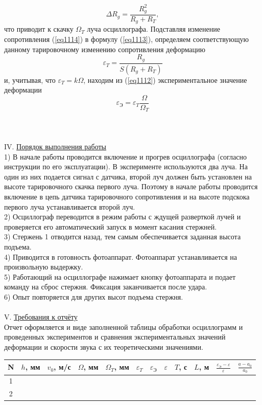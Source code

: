 \documentclass[specialist, subf, href, colorlinks=true, 14pt, final]{disser}
\theoremstyle{definition}
\begin{document}
\begin{equation}\label{eq1114}
  \Delta R_{g} = \frac{R_{g}^{2}}{R_{g} + R_{T}},
\end{equation}
что приводит к скачку $\Omega_{T}$ луча осциллографа. Подставляя изменение сопротивления (\ref{eq1114}) в формулу (\ref{eq1113}), определяем соответствующую данному тарировочному изменению сопротивления деформацию
\[
  \varepsilon_{T} = \frac{R_{g}}{S(R_{g}+R_{T})}
\]
и, учитывая, что $\varepsilon_{T} = k\Omega$, находим из (\ref{eq1112}) экспериментальное
значение деформации
\[
  \varepsilon_{\text{Э}} = \varepsilon_{T}\frac{\Omega}{\Omega_{T}}
\]
\\\\\\
IV. \underline{Порядок выполнения работы}\\
1) В начале работы проводится включение и прогрев осциллографа (согласно инструкции по его эксплуатации). В эксперименте используются два луча. На один из них подается сигнал с датчика, второй луч должен быть установлен на высоте тарировочного скачка первого луча. Поэтому в начале работы проводится включение в цепь датчика тарировочного сопротивления и на высоте подскока первого луча устанавливается второй луч.\\
2) Осциллограф переводится в режим работы с ждущей разверткой лучей и проверяется его автоматический запуск в момент касания стержней.\\
3) Стержень 1 отводится назад, тем самым обеспечивается заданная высота подъема.\\
4) Приводится в готовность фотоаппарат. Фотоаппарат устанавливается на произвольную выдержку.\\
5) Работающий на осциллографе нажимает кнопку фотоаппарата и подает команду на сброс стержня. Фиксация заканчивается после удара.\\
6) Опыт повторяется для других высот подъема стержня.\\
\\
V. \underline{Требования к отчёту}\\
Отчет оформляется и виде заполненной таблицы обработки осциллограмм и проведенных экспериментов и сравнения экспериментальных значений деформации и скорости звука с их теоретическими значениями.
\begin{center}
\begin{tabular}{|c|c|c|c|c|c|c|c|c|c|c|c|}
\hline
N &$h$, мм&$v_0$, м/с&$\Omega$, мм&$\Omega_T$, мм& $\varepsilon_T$ & $\varepsilon_{\text{Э}}$ & $\varepsilon$ & $T$, с & $L$, м & $\frac{\varepsilon_{\text{Э}} - \varepsilon}{\varepsilon}$ & $\frac{a - a_{0}}{a_{0}}$\\
\hline
1 &  &  &  &  &  &  &  & &  &  &\\
\hline
2 &  &  &  &  &  &  &  & &  &  &\\
\hline
\end{tabular}
\end{center}
\end{document}
